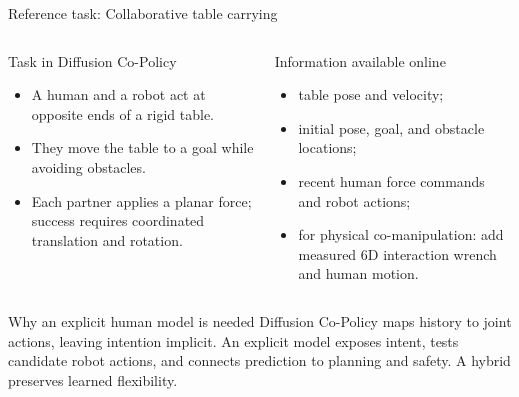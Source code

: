 \documentclass[aspectratio=169,11pt]{beamer}
\begin{document}
\begin{frame}{Reference task: Collaborative table carrying}
\begin{columns}[T,onlytextwidth]
\begin{block}{Task in Diffusion Co-Policy}
\begin{itemize}
  \item A human and a robot act at opposite ends of a rigid table.
  \item They move the table to a goal while avoiding obstacles.
  \item Each partner applies a planar force; success requires coordinated translation and rotation.
\end{itemize}
\end{block}
\begin{block}{Information available online}
\begin{itemize}
  \item table pose and velocity;
  \item initial pose, goal, and obstacle locations;
  \item recent human force commands and robot actions;
  \item for physical co-manipulation: add measured 6D interaction wrench and human motion.
\end{itemize}
\end{block}
\end{columns}
\vspace{0.02cm}
\begin{alertblock}{Why an explicit human model is needed}
Diffusion Co-Policy maps history to joint actions, leaving intention implicit. An explicit model exposes intent, tests candidate robot actions, and connects prediction to planning and safety. A hybrid preserves learned flexibility.
\end{alertblock}

\end{frame}
\end{document}
